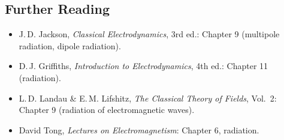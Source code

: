 \subsection*{Further Reading}
\begin{itemize}
  \item J.\,D. Jackson, \textit{Classical Electrodynamics}, 3rd ed.: Chapter 9
        (multipole radiation, dipole radiation).
  \item D.\,J. Griffiths, \textit{Introduction to Electrodynamics}, 4th ed.: Chapter 11
        (radiation).
  \item L.\,D. Landau \& E.\,M. Lifshitz, \textit{The Classical Theory of Fields}, Vol.\ 2:
        Chapter 9 (radiation of electromagnetic waves).
  \item David Tong, \textit{Lectures on Electromagnetism}: Chapter 6, radiation.
\end{itemize}
